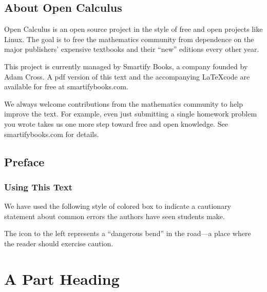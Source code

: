 \documentclass[11pt]{book}
\newcounter{error}[chapter]
\numberwithin{example}{chapter}
\begin{document}
\chapter*{About Open Calculus}

Open Calculus is an open source project in the style of free and open projects like Linux.  The goal is to free the mathematics community from dependence on the major publishers' expensive textbooks and their ``new'' editions every other year.  

This project is currently managed by Smartify Books, a company founded by Adam Cross.  A pdf version of this text and the accompanying \LaTeX code are available for free at smartifybooks.com.  

We always welcome contributions from the mathematics community to help improve the text.  For example, even just submitting a single homework problem you wrote takes us one more step toward free and open knowledge.  See smartifybooks.com for details.  



\tableofcontents                        %










\mainmatter                             %


\chapter*{Preface}

\section{Using This Text}


We have used the following style of colored box to indicate a cautionary statement about common errors the authors have seen students make.  

\begin{error}
The icon to the left represents a ``dangerous bend'' in the road---a place where the reader should exercise caution.
\end{error}



\part{A Part Heading}                   %
\end{document}
